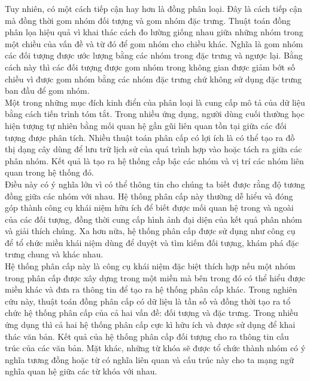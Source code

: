 \hspace*{10mm}Tuy nhiên, có một cách tiếp cận hay hơn là đồng phân loại. Đây là cách tiếp cận mà đồng thời gom nhóm đối tượng và gom nhóm đặc trưng. Thuật toán đồng phân lọa hiệu quả vì khai thác cách đo lường giống nhau giữa những nhóm trong một chiều của vấn đề và từ đó để gom nhóm cho chiều khác. Nghĩa là gom nhóm các đối tượng được ước lượng bằng các nhóm trong đặc trưng và ngược lại. Bằng cách này thì các đối tượng được gom nhóm trong không gian được giảm bớt số chiều vì được gom nhóm bằng các nhóm đặc trưng chứ không sử dụng đặc trưng ban đầu để gom nhóm. \\
\hspace*{10mm}Một trong những mục đích kinh điển của phân loại là cung cấp mô tả của dữ liệu bằng cách tiến trình tóm tắt. Trong nhiều ứng dụng, người dùng cuối thường học hiện tượng tự nhiên bằng mối quan hệ gần gũi liên quan tồn tại giữa các đối tượng được phân tích. Nhiều thuật toán phân cấp có lợi ích là có thể tạo ra đồ thị dạng cây dùng để lưu trữ lịch sử của quá trình hợp vào hoặc tách ra giữa các phân nhóm. Kết quả là tạo ra hệ thống cấp bậc các nhóm và vị trí các nhóm liên quan trong hệ thống đó.\\
\hspace*{10mm}Điều này có ý nghĩa lớn vì có thể thông tin cho chúng ta biết được rằng độ tương đồng giữa các nhóm với nhau. Hệ thống phân cấp này thường dễ hiểu và đóng góp thành công cụ khái niệm hữu ích để biết được mối quan hệ trong và ngoài của các đối tượng, đồng thời cung cấp hình ảnh đại diện của kết quả phân nhóm và giải thích chúng. Xa hơn nữa, hệ thống phân cấp được sử dụng như công cụ để tổ chức miền khái niệm dùng để duyệt và tìm kiếm đối tượng, khám phá đặc trưng chung và khác nhau. \\
\hspace*{10mm}Hệ thống phân cấp này là công cụ khái niệm đặc biệt thích hợp nếu một nhóm trong phân cấp được xây dựng trong một miền mà bên trong đó có thể hiểu được miền khác và đưa ra thông tin để tạo ra hệ thống phân cấp khác. Trong nghiên cứu này, thuật toán đồng phân cấp có dữ liệu là tần số và đồng thời tạo ra tổ chức hệ thống phân cấp của cả hai vấn đề: đối tượng và đặc trưng. Trong nhiều ứng dụng thì cả hai hệ thống phân cấp cực kì hữu ích và được sử dụng để khai thác văn bản. Kết quả của hệ thống phân cấp đối tượng cho ra thông tin cấu trúc của các văn bản. Mặt khác, những từ khóa sẽ được tổ chức thành nhóm có ý nghĩa tương đồng hoặc từ có nghĩa liên quan và cấu trúc này cho ta mạng ngữ nghĩa quan hệ giữa các từ khóa với nhau. \\

